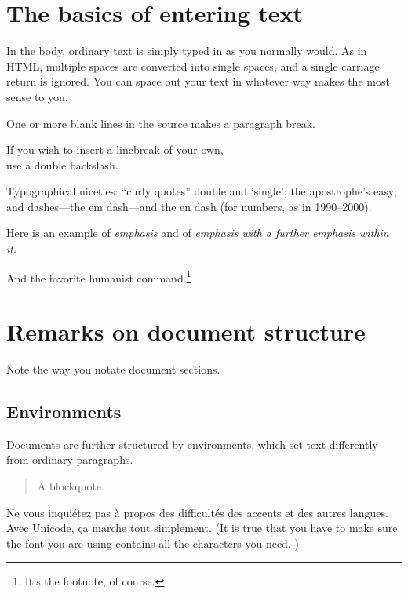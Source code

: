 \documentclass[12pt]{article}
\begin{document}
\section{The basics of entering text}

In the body, ordinary text is simply typed in as you normally would. As in HTML, multiple spaces are converted      into  single spaces, and
a single carriage return is
ignored. You can space out your text in whatever way makes the most sense to you.

One or more blank lines in the source makes a paragraph break. 

If you wish to insert a linebreak of your own, \\ use a double backslash.

Typographical niceties: ``curly quotes'' double and `single'; the apostrophe's easy; and dashes---the em dash---and the en dash (for numbers, as in 1990--2000).

Here is an example of \emph{emphasis} and of \emph{emphasis with a \emph{further} emphasis within it}.

And the favorite humanist command.\footnote{It's the footnote, of course.}

\section{Remarks on document structure}

Note the way you notate document sections.

\subsection{Environments}

Documents are further structured by environments, which set text differently from ordinary paragraphs.
\begin{quote}
A blockquote.
\end{quote}
Ne vous inquiétez pas à propos des difficultés des accents et des autres langues. Avec Unicode, ça marche tout simplement. (It is true that you have to make sure the font you are using contains all the characters you need. )

\end{document}
